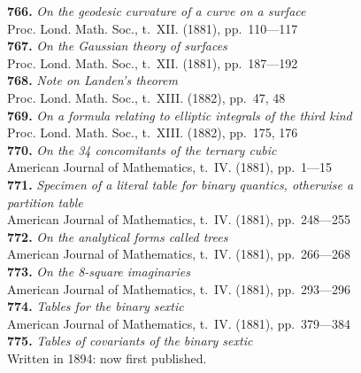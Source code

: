 \documentclass[11pt,a4paper]{book}
\begin{document}
\textbf{766.} \textit{On the geodesic curvature of a curve on a surface} \\
\hspace*{2em}Proc. Lond. Math. Soc., t.~XII. (1881), pp.~110---117\\[0.3em]
\textbf{767.} \textit{On the Gaussian theory of surfaces} \\
\hspace*{2em}Proc. Lond. Math. Soc., t.~XII. (1881), pp.~187---192\\[0.3em]
\textbf{768.} \textit{Note on Landen's theorem} \\
\hspace*{2em}Proc. Lond. Math. Soc., t.~XIII. (1882), pp.~47, 48\\[0.3em]
\textbf{769.} \textit{On a formula relating to elliptic integrals of the third kind} \\
\hspace*{2em}Proc. Lond. Math. Soc., t.~XIII. (1882), pp.~175, 176\\[0.3em]
\textbf{770.} \textit{On the 34 concomitants of the ternary cubic} \\
\hspace*{2em}American Journal of Mathematics, t.~IV. (1881), pp.~1---15\\[0.3em]
\textbf{771.} \textit{Specimen of a literal table for binary quantics, otherwise a}\\
\hspace*{2em}\textit{partition table} \\
\hspace*{2em}American Journal of Mathematics, t.~IV. (1881), pp.~248---255\\[0.3em]
\textbf{772.} \textit{On the analytical forms called trees} \\
\hspace*{2em}American Journal of Mathematics, t.~IV. (1881), pp.~266---268\\[0.3em]
\textbf{773.} \textit{On the 8-square imaginaries} \\
\hspace*{2em}American Journal of Mathematics, t.~IV. (1881), pp.~293---296\\[0.3em]
\textbf{774.} \textit{Tables for the binary sextic} \\
\hspace*{2em}American Journal of Mathematics, t.~IV. (1881), pp.~379---384\\[0.3em]
\textbf{775.} \textit{Tables of covariants of the binary sextic} \\
\hspace*{2em}Written in 1894: now first published.
\end{document}
